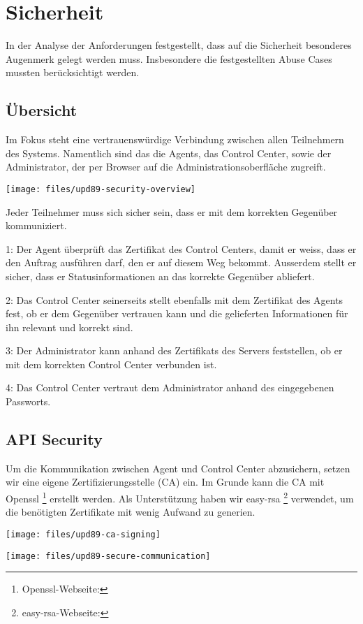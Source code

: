 \section{Sicherheit}

In der Analyse der Anforderungen festgestellt, dass auf die Sicherheit besonderes Augenmerk gelegt werden muss. Insbesondere die festgestellten Abuse Cases mussten berücksichtigt werden.

\subsection{Übersicht}

Im Fokus steht eine vertrauenswürdige Verbindung zwischen allen Teilnehmern des Systems. Namentlich sind das die Agents, das Control Center, sowie der Administrator, der per Browser auf die Administrationsoberfläche zugreift.

\begin{center}
    \texttt{[image: files/upd89-security-overview]}
\end{center}

\xxx[caption!]

Jeder Teilnehmer muss sich sicher sein, dass er mit dem korrekten Gegenüber kommuniziert.

1: Der Agent überprüft das Zertifikat des Control Centers, damit er weiss, dass er den Auftrag ausführen darf, den er auf diesem Weg bekommt. Ausserdem stellt er sicher, dass er Statusinformationen an das korrekte Gegenüber abliefert.

2: Das Control Center seinerseits stellt ebenfalls mit dem Zertifikat des Agents fest, ob er dem Gegenüber vertrauen kann und die gelieferten Informationen für ihn relevant und korrekt sind.

3: Der Administrator kann anhand des Zertifikats des Servers feststellen, ob er mit dem korrekten Control Center verbunden ist.

4: Das Control Center vertraut dem Administrator anhand des eingegebenen Passworts.

\subsection{API Security}

Um die Kommunikation zwischen Agent und Control Center abzusichern, setzen wir eine eigene Zertifizierungsstelle (CA) ein. Im Grunde kann die CA mit Openssl \footnote{Openssl-Webseite: } erstellt werden. Als Unterstützung haben wir easy-rsa \footnote{easy-rsa-Webseite: } verwendet, um die benötigten Zertifikate mit wenig Aufwand zu generien.

\begin{center}
    \texttt{[image: files/upd89-ca-signing]}
\end{center}

\xxx[caption!]

\begin{center}
    \texttt{[image: files/upd89-secure-communication]}
\end{center}

\xxx[caption!]

